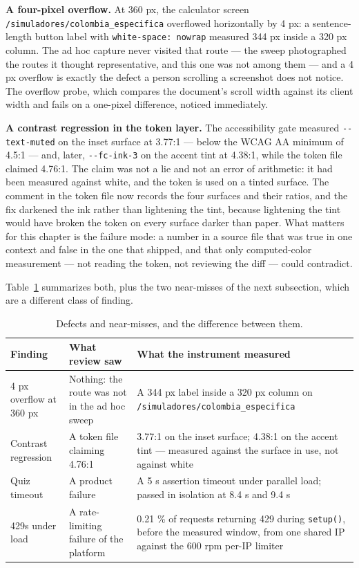 \textbf{A four-pixel overflow.} At 360 px, the calculator screen
\verb|/simuladores/colombia_especifica| overflowed horizontally by 4 px: a sentence-length button
label with \verb|white-space: nowrap| measured 344 px inside a 320 px column. The ad hoc capture
never visited that route — the sweep photographed the routes it thought representative, and this one
was not among them — and a 4 px overflow is exactly the defect a person scrolling a screenshot does
not notice. The overflow probe, which compares the document's scroll width against its client width
and fails on a one-pixel difference, noticed immediately.

\textbf{A contrast regression in the token layer.} The accessibility gate measured
\verb|--text-muted| on the inset surface at 3.77:1 — below the WCAG AA minimum of 4.5:1 — and,
later, \verb|--fc-ink-3| on the accent tint at 4.38:1, while the token file claimed 4.76:1. The
claim was not a lie and not an error of arithmetic: it had been measured against white, and the
token is used on a tinted surface. The comment in the token file now records the four surfaces and
their ratios, and the fix darkened the ink rather than lightening the tint, because lightening the
tint would have broken the token on every surface darker than paper. What matters for this chapter
is the failure mode: a number in a source file that was true in one context and false in the one
that shipped, and that only computed-color measurement — not reading the token, not reviewing the
diff — could contradict.

Table~\ref{tab:defects} summarizes both, plus the two near-misses of the next subsection, which are
a different class of finding.

\begin{table}[htbp]
  \centering
  \begin{tabular}{p{3.6cm}p{4.6cm}p{5.6cm}}
    \hline
    Finding & What review saw & What the instrument measured \\
    \hline
    4 px overflow at 360 px & Nothing: the route was not in the ad hoc sweep & A 344 px label inside a 320 px column on \verb|/simuladores/colombia_especifica| \\
    Contrast regression & A token file claiming 4.76:1 & 3.77:1 on the inset surface; 4.38:1 on the accent tint — measured against the surface in use, not against white \\
    Quiz timeout & A product failure & A 5 s assertion timeout under parallel load; passed in isolation at 8.4 s and 9.4 s \\
    429s under load & A rate-limiting failure of the platform & 0.21 \% of requests returning 429 during \verb|setup()|, before the measured window, from one shared IP against the 600 rpm per-IP limiter \\
    \hline
  \end{tabular}
  \caption{Defects and near-misses, and the difference between them.}
  \label{tab:defects}
\end{table}

